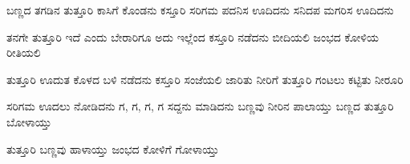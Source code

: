 \documentclass{article}
\begin{document}

\begin{poem}
\begin{stanza}
ಬಣ್ಣದ ತಗಡಿನ ತುತ್ತೂರಿ \verseline
ಕಾಸಿಗೆ ಕೊಂಡನು ಕಸ್ತೂರಿ \verseline
ಸರಿಗಮ ಪದನಿಸ ಊದಿದನು \verseline
ಸನಿದಪ ಮಗರಿಸ ಊದಿದನು
\end{stanza} 
\begin{stanza}
ತನಗೇ ತುತ್ತೂರಿ ಇದೆ ಎಂದು \verseline
ಬೇರಾರಿಗೂ ಅದು ಇಲ್ಲೆಂದ \verseline
ಕಸ್ತೂರಿ ನಡೆದನು ಬೀದಿಯಲಿ \verseline
ಜಂಭದ ಕೋಳಿಯ ರೀತಿಯಲಿ
\end{stanza}
\begin{stanza}
ತುತ್ತೂರಿ ಊದುತ ಕೊಳದ ಬಳಿ \verseline
ನಡೆದನು ಕಸ್ತೂರಿ ಸಂಜೆಯಲಿ \verseline
ಜಾರಿತು ನೀರಿಗೆ ತುತ್ತೂರಿ \verseline
ಗಂಟಲು ಕಟ್ಟಿತು ನೀರೂರಿ
\end{stanza}
\begin{stanza}
ಸರಿಗಮ ಊದಲು ನೋಡಿದನು \verseline
ಗ, ಗ, ಗ, ಗ ಸದ್ದನು ಮಾಡಿದನು \verseline
ಬಣ್ಣವು ನೀರಿನ ಪಾಲಾಯ್ತು \verseline
ಬಣ್ಣದ ತುತ್ತೂರಿ ಬೋಳಾಯ್ತು
\end{stanza}
\begin{stanza}
ತುತ್ತೂರಿ ಬಣ್ಣವು ಹಾಳಾಯ್ತು \verseline
ಜಂಭದ ಕೋಳಿಗೆ ಗೋಳಾಯ್ತು
\end{stanza}
\end{poem}
\end{document}
